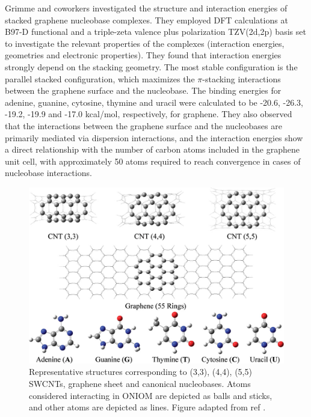 Grimme and coworkers investigated the structure and interaction energies of stacked graphene nucleobase complexes.\supercite{antony_structures_2008} They employed DFT calculations at B97-D functional and a triple-zeta valence plus polarization TZV(2d,2p) basis set to investigate the relevant properties of the complexes (interaction energies, geometries and electronic properties). They found that interaction energies strongly depend on the stacking geometry. The most stable configuration is the parallel stacked configuration, which maximizes the $\pi$-stacking interactions between the graphene surface and the nucleobase. The binding energies for adenine, guanine, cytosine, thymine and uracil were calculated to be -20.6, -26.3, -19.2, -19.9 and -17.0 kcal/mol, respectively, for graphene. They also observed that the interactions between the graphene surface and the nucleobases are primarily mediated via dispersion interactions, and the interaction energies show a direct relationship with the number of carbon atoms included in the graphene unit cell, with approximately 50 atoms required to reach convergence in cases of nucleobase interactions.
\begin{figure}
    \centering
    \includegraphics{Introduction/Figures/Figure3.png}
    \caption[Representative structures corresponding to (3,3), (4,4), (5,5) SWCNTs, graphene sheet and canonical nucleobases]{Representative structures corresponding to (3,3), (4,4), (5,5) SWCNTs, graphene sheet and canonical nucleobases. Atoms considered interacting in ONIOM are depicted as balls and sticks, and other atoms are depicted as lines. Figure adapted from ref \supercite{umadevi_quantum_2011}.}
    \label{fig:my_label}
\end{figure}

